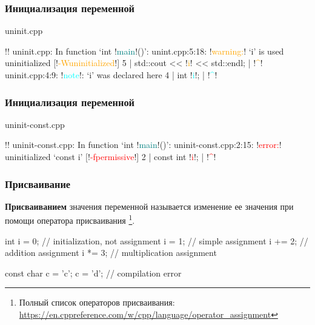 \documentclass[compress, 8pt]{beamer}
\begin{document}
\begin{frame}[fragile]

    \frametitle{Инициализация переменной}

        {uninit.cpp}

    \begin{terminalwindow}
        !!
uninit.cpp: In function ‘int !\textcolor{teal}{main}!()’:
unint.cpp:5:18: !\textcolor{orange}{warning:}! ‘i’ is used uninitialized [!\textcolor{orange}{-Wuninitialized}!]
    5 |     std::cout << !\textcolor{orange}{i}! << std::endl;
      |                  !\textcolor{orange}{\^{}}!
uninit.cpp:4:9: !\textcolor{cyan}{note}!: ‘i’ was declared here
    4 |     int !\textcolor{cyan}{i}!;
      |         !\textcolor{cyan}{\^{}}!
    \end{terminalwindow}

\end{frame}

\begin{frame}[fragile]

    \frametitle{Инициализация переменной}

        {uninit-const.cpp}

    \begin{terminalwindow}
!!
uninit-const.cpp: In function ‘int !\textcolor{teal}{main}!()’:
uninit-const.cpp:2:15: !\textcolor{red}{error:}! uninitialized ‘const i’ [!\textcolor{red}{-fpermissive}!]
    2 |     const int !\textcolor{red}{i}!;
      |               !\textcolor{red}{\^{}}!
    \end{terminalwindow}

\end{frame}

\begin{frame}[fragile]

    \frametitle{Присваивание}

    \textbf{Присваиванием} значения переменной называется изменение ее
        значения при помощи оператора присваивания
        \footnote{Полный список операторов присваивания:
            \url{https://en.cppreference.com/w/cpp/language/operator\_assignment}}.

    \begin{myinplacelisting}[minted language=cpp]
int i = 0;  // initialization, not assignment
i = 1;      // simple assignment
i += 2;     // addition assignment
i *= 3;     // multiplication assignment

const char c = 'c';
c = 'd';    // compilation error
    \end{myinplacelisting}

\end{frame}
\end{document}
